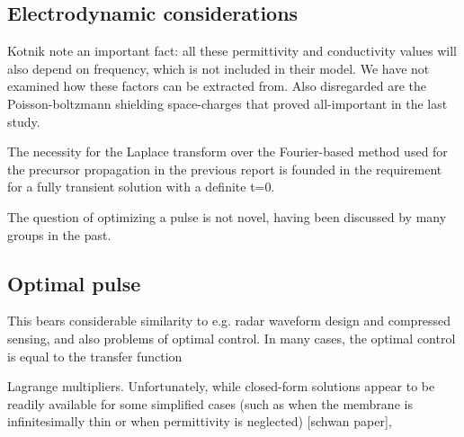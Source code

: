 \documentclass[fleqn,10pt]{paper}
\begin{document}


\subsection{Electrodynamic considerations}

Kotnik note an important fact: all these permittivity and conductivity values will also depend on frequency, which is not included in their model. We have not examined how these factors can be extracted from. Also disregarded are the Poisson-boltzmann shielding space-charges that proved all-important in the last study. 

The necessity for the Laplace transform over the Fourier-based method used for the precursor propagation in the previous report is founded in the requirement for a fully transient solution with a definite t=0.

The question of optimizing a pulse is not novel, having been discussed by many groups in the past.

\subsection{Optimal pulse}

This bears considerable similarity to e.g. radar waveform design and compressed sensing, and also problems of optimal control. In many cases, the optimal control is equal to the transfer function

Lagrange multipliers. Unfortunately, while closed-form solutions appear to be readily available for some simplified cases (such as when the membrane is infinitesimally thin or when permittivity is neglected) [schwan paper], 
\end{document}
